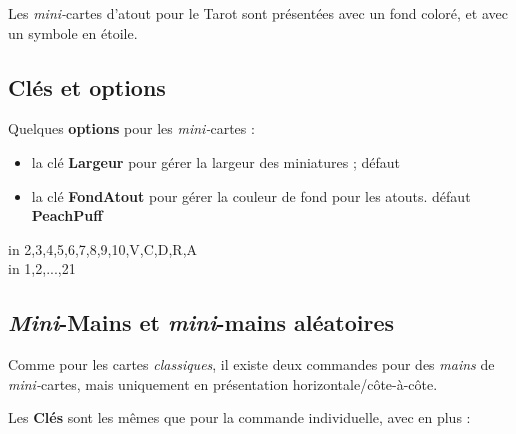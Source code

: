 \documentclass{article}
\newcommand\Cle[1]{{\bfseries\sffamily\textlangle #1\textrangle}}
\begin{document}
{{{{{{{{{\begin{codeinfo}
Les \textit{mini-}cartes d'atout pour le Tarot sont présentées avec un fond coloré, et avec un symbole en étoile.
\end{codeinfo}

\subsection{Clés et options}

\begin{codecles}
Quelques \Cle{options} pour les \textit{mini-}cartes :

\begin{itemize}
	\item la clé \Cle{Largeur} pour gérer la largeur des miniatures ; \hfill{}défaut \Cle{0.55cm}
	\item la clé \Cle{FondAtout} pour gérer la couleur de fond pour les atouts. \hfill{}défaut \Cle{PeachPuff}
\end{itemize}
\end{codecles}

\begin{codetex}[]
\foreach \EECARTE in {2,3,4,5,6,7,8,9,10,V,C,D,R,A}{}\\
%
\foreach \EECARTE in {1,2,...,21}{}
\end{codetex}

\subsection{\textit{Mini}-Mains et \textit{mini}-mains aléatoires}

\begin{codeidee}
Comme pour les cartes \textit{classiques}, il existe deux commandes pour des \textit{mains} de \textit{mini-}cartes, mais uniquement en présentation horizontale/côte-à-côte.
\end{codeidee}

\begin{codetex}

\end{codetex}

\begin{codecles}
Les \Cle{Clés} sont les mêmes que pour la commande individuelle, avec en plus :


\end{codecles}}}}}}}}}}
\end{document}
